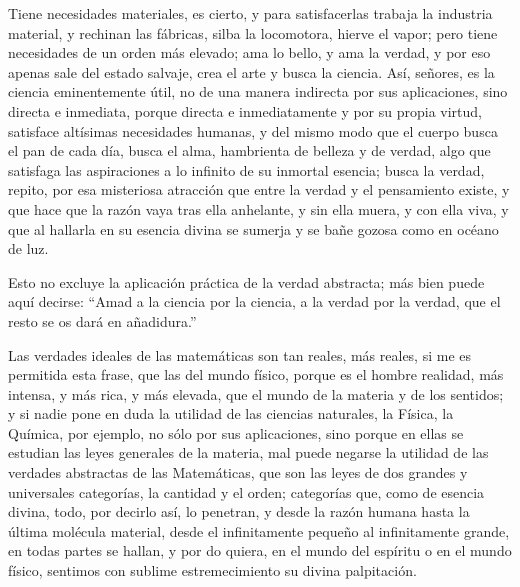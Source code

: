 \documentclass[a4paper, 12pt]{article}
\begin{document}
{{{Tiene necesidades materiales, es cierto, y para satisfacerlas trabaja la industria material, y rechinan las fábricas, silba la locomotora, hierve el vapor; pero tiene necesidades de un orden más elevado; ama lo bello, y ama la verdad, y por eso apenas sale del estado salvaje, crea el arte y busca la ciencia.  Así, señores, es la ciencia eminentemente útil, no de una manera indirecta por sus aplicaciones, sino directa e inmediata, porque directa e inmediatamente y por su propia virtud, satisface altísimas necesidades humanas, y del mismo modo que el cuerpo busca el pan de cada día, busca el alma, hambrienta de belleza y de verdad, algo que satisfaga las aspiraciones a lo infinito de su inmortal esencia; busca la verdad, repito, por esa misteriosa atracción que entre la verdad y el pensamiento existe, y que hace que la razón vaya tras ella anhelante, y sin ella muera, y con ella viva, y que al hallarla en su esencia divina se sumerja y se bañe gozosa como en océano de luz.

Esto no excluye la aplicación práctica de la verdad abstracta; más bien puede aquí decirse: ``Amad a la ciencia por la ciencia, a la verdad por la verdad, que el resto se os dará en añadidura.''

Las verdades ideales de las matemáticas son tan reales, más reales, si me es permitida esta frase, que las del mundo físico, porque es el hombre realidad, más intensa, y más rica, y más elevada, que el mundo de la materia y de los sentidos; y si nadie pone en duda la utilidad de las ciencias naturales, la Física, la Química, por ejemplo, no sólo por sus aplicaciones, sino porque en ellas se estudian las leyes generales de la materia, mal puede negarse la utilidad de las verdades abstractas de las Matemáticas, que son las leyes de dos grandes y universales categorías, la cantidad y el orden; categorías que, como de esencia divina, todo, por decirlo así, lo penetran, y desde la razón humana hasta la última molécula material, desde el infinitamente pequeño al infinitamente grande, en todas partes se hallan, y por do quiera, en el mundo del espíritu o en el mundo físico, sentimos con sublime estremecimiento su divina palpitación.

}}}
\end{document}
